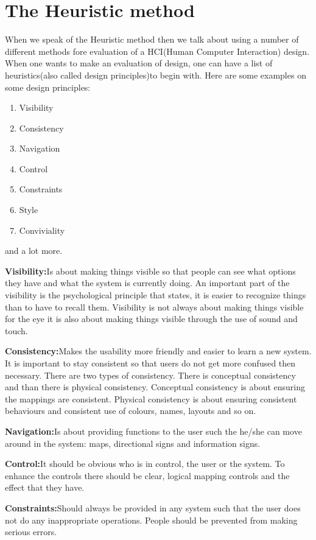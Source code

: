 \section{The Heuristic method}
When we speak of the Heuristic method then we talk about using a number of different methods fore evaluation of a HCI(Human Computer Interaction) design. When one wants to make an evaluation of design, one can have a list of heuristics(also called design principles)to begin with. Here are some examples on some design principles:
\begin{enumerate}
\item Visibility
\item Consistency
\item Navigation
\item Control
\item Constraints
\item Style
\item Conviviality
\end{enumerate}
and a lot more.

\textbf{Visibility:}Is about making things visible so that people can see what options they have and what the system is currently doing. An important part of the visibility is the psychological principle that states, it is easier to recognize things than to have to recall them. Visibility is not always about making things visible for the eye it is also about making things visible through the use of sound and touch.

\textbf{Consistency:}Makes the usability more friendly and easier to learn a new system. It is important to stay consistent so that users do not get more confused then necessary. There are two types of consistency. There is conceptual consistency and than there is physical consistency. Conceptual consistency is about ensuring the mappings are consistent. Physical consistency is about ensuring consistent behaviours and consistent use of colours, names, layouts and so on.

\textbf{Navigation:}Is about providing functions to the user such the he/she can move around in the system: maps, directional signs and information signs.

\textbf{Control:}It should be obvious who is in control, the user or the system. To enhance the controls there should be clear, logical mapping controls and the effect that they have.

\textbf{Constraints:}Should always be provided in any system such that the user does not do any inappropriate operations. People should be prevented from making serious errors.

